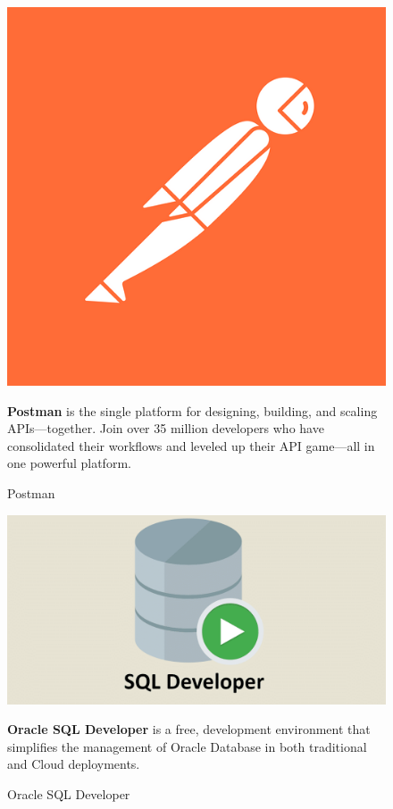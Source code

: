 \begin{figure}[h]
\centering
\begin{minipage}{0.3\textwidth}
    \centering
    \includegraphics[width=\linewidth,frame]{figures/postman.png}
    \caption{Postman}
\end{minipage}
\hfill
\begin{minipage}{0.6\textwidth}
  \textbf{Postman} is the single platform for designing, building, and scaling APIs—together. Join over 35 million developers who have consolidated their workflows and leveled up their API game—all in one powerful platform.\cite{samplewebs12}
\end{minipage}
\end{figure}

\begin{figure}[h]
\centering
\begin{minipage}{0.3\textwidth}
    \centering
    \includegraphics[width=\linewidth,frame]{figures/sql developer.png}
    \caption{Oracle SQL Developer}
\end{minipage}
\hfill
\begin{minipage}{0.6\textwidth}
  \textbf{Oracle SQL Developer} is a free, development environment that simplifies the management of Oracle Database in both traditional and Cloud deployments.\cite{samplewebs13}
\end{minipage}
\end{figure}

